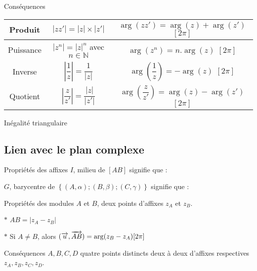 \newpage

\begin{bclogo}{Conséquences}
\begin{center}
\begin{tabular}{|c|c|c|}
\hline
Produit&$|zz'|=|z|\times |z'|$&$\arg (zz')=\arg (z)+\arg (z')$ $[2\pi]$\\
\hline
Puissance&$|z^n|=|z|^n$ avec $n\in \mathbb{N}$&$\arg (z^n)=n.\arg (z)$ $[2\pi]$\\
\hline
Inverse&$|\dfrac{1}{z}|=\dfrac{1}{|z|}$&$\arg \left( \dfrac{1}{z}\right) =-\arg (z)$ $[2\pi]$\\
\hline
Quotient&$|\dfrac{z}{z'}|=\dfrac{|z|}{|z'|}$&$\arg \left( \dfrac{z}{z'}\right) =\arg (z)-\arg (z')$ $[2\pi]$\\
\hline
\end{tabular}
\end{center}
\end{bclogo}

\medskip

\begin{bclogo}{Inégalité triangulaire}
\end{bclogo}

\subsection{Lien avec le plan complexe}

\begin{bclogo}{Propriétés des affixes}
$I$, milieu de $[AB]$ signifie que : 

$G$, barycentre de $\left\lbrace (A,\alpha); (B,\beta); (C,\gamma )\right\rbrace$ signifie que :
\end{bclogo} 

\medskip

\begin{bclogo}{Propriétés des modules}
$A$ et $B$, deux points d'affixes $z_A$ et $z_B$.

$\ast$ $AB=|z_A-z_B|$

$\ast$ Si $A\neq B$, alors $(\overrightarrow{u},\overrightarrow{AB})=\arg (z_B-z_A) [2\pi]$
\end{bclogo}

\medskip

\begin{bclogo}{Conséquences }
$A,B,C,D$ quatre points distincts deux à deux d'affixes respectives $z_A,z_B,z_C,z_D$.

\end{bclogo}

